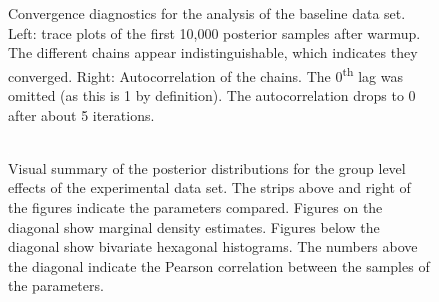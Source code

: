 \documentclass[a4paper]{article}
\begin{document}
\begin{figure}[!ht]
\begin{subfigure}{.5\textwidth}
	\end{subfigure}%
	\caption{
		Convergence diagnostics for the analysis of the baseline data set. Left: trace plots of the first 10,000 posterior samples after warmup. The different chains appear indistinguishable, which indicates they converged. Right: Autocorrelation of the chains. The 0\textsuperscript{th} lag was omitted (as this is 1 by definition). The autocorrelation drops to 0 after about 5 iterations.}
	\label{fig:baselinePosteriorDiagnostics}
\end{figure}



\begin{figure}[!ht]
	\includegraphics[width=\textwidth]{baselinePosteriorDescriptivesPlot.pdf}
	\caption{Visual summary of the posterior distributions for the group level effects of the experimental data set. The strips above and right of the figures indicate the parameters compared. Figures on the diagonal show marginal density estimates. Figures below the diagonal show bivariate hexagonal histograms. The numbers above the diagonal indicate the Pearson correlation between the samples of the parameters.}
	\label{fig:productPosteriorDescriptives}
\end{figure}
\end{document}
